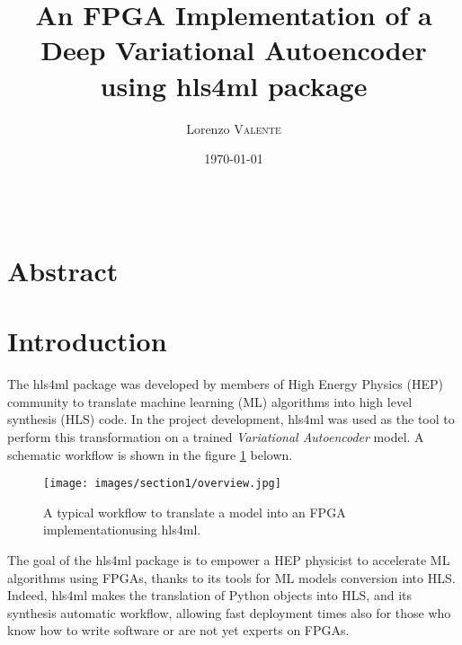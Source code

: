 \documentclass{article}
\title{\textbf{An FPGA Implementation of a\\ Deep Variational Autoencoder using hls4ml package}} %
\author{Lorenzo \textsc{Valente}} %
\date{\today} %
\begin{document}
\maketitle %

\begin{center}
\begin{tabular}{l r}
\end{tabular}
\end{center}



\section*{Abstract}



\section{Introduction}

The hls4ml package was developed by members of High Energy Physics (HEP) community
to translate machine learning (ML) algorithms into high level synthesis (HLS) code.
In the project development, hls4ml was used as the tool to perform 
this transformation on a trained \textit{Variational Autoencoder} model.
A schematic workflow is shown in the figure \ref{fig:overview} belown.
 
\begin{figure}[H]
\centering
\texttt{[image: images/section1/overview.jpg]}
\caption{A typical workflow to translate a model into an FPGA implementationusing hls4ml.}
\label{fig:overview}
\end{figure}

The goal of the hls4ml package is to empower a HEP physicist to accelerate
ML algorithms using FPGAs, thanks to its tools for ML models conversion into HLS. 
Indeed, hls4ml makes the translation of Python objects into HLS, and its
synthesis automatic workflow, allowing fast deployment times also for
those who know how to write software or are not yet experts on FPGAs.
\end{document}
